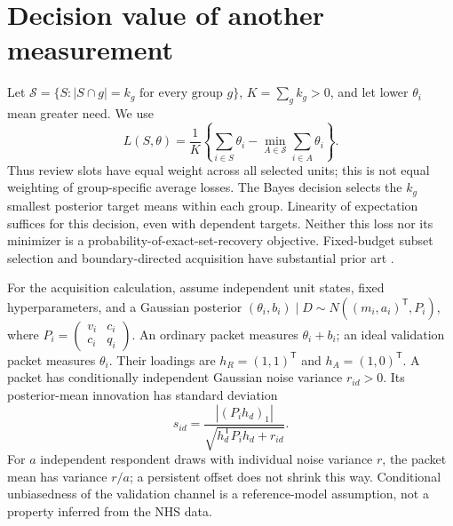 
\section{Decision value of another measurement}
\label{sec:information_theory}
Let $\mathcal S=\{S:|S\cap g|=k_g\text{ for every group }g\}$,
$K=\sum_g k_g>0$, and let lower $\theta_i$ mean greater need. We use
\begin{equation}
 L(S,\theta)=\frac{1}{K}\left\{\sum_{i\in S}\theta_i-
          \min_{A\in\mathcal S}\sum_{i\in A}\theta_i\right\}.
 \label{eq:aisi_loss}
\end{equation}
Thus review slots have equal weight across all selected units; this is not
equal weighting of group-specific average losses. The Bayes decision selects
the $k_g$ smallest posterior target means within each group. Linearity of
expectation suffices for this decision, even with dependent targets.
Neither this loss nor its minimizer is a probability-of-exact-set-recovery
objective. Fixed-budget subset selection and boundary-directed acquisition
have substantial prior art \citep{chen2008subset,kalyanakrishnan2012pac,chen2014combinatorial}.

For the acquisition calculation, assume independent unit states, fixed
hyperparameters, and a Gaussian posterior
$(\theta_i,b_i)\mid D\sim N((m_i,a_i)^{\mathsf T},P_i)$, where
$P_i=\left(\begin{smallmatrix}v_i&c_i\\c_i&q_i\end{smallmatrix}\right)$.
An ordinary packet measures $\theta_i+b_i$; an ideal validation packet
measures $\theta_i$. Their loadings are $h_R=(1,1)^{\mathsf T}$ and
$h_A=(1,0)^{\mathsf T}$. A packet has conditionally independent Gaussian
noise variance $r_{id}>0$. Its posterior-mean innovation has standard deviation
\begin{equation}
 s_{id}=\frac{|(P_i h_d)_1|}{\sqrt{h_d^{\mathsf T}P_i h_d+r_{id}}}.
 \label{eq:aisi_innovation}
\end{equation}
For $a$ independent respondent draws with individual noise variance $r$,
the packet mean has variance $r/a$; a persistent offset does not shrink this way.
Conditional unbiasedness of the validation channel is a reference-model
assumption, not a property inferred from the NHS data.

